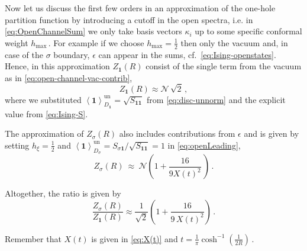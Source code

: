 \documentclass[11pt,a4paper]{article}
\numberwithin{equation}{section}
\newcommand{\one}{\mathbf{1}} %
\begin{document}
Now let us discuss the first few orders in an approximation of the one-hole partition function by introducing a cutoff in the open spectra, i.e. in \eqref{eq:OpenChannelSum} we only take basis vectors $\kappa_i$ 
up to some specific conformal weight $h_\mathrm{max}$\,. 
For example if we choose $h_\mathrm{max} = \frac12$ then only the vacuum and, in case of the $\sigma$ boundary, $\epsilon$ can appear in the sums, cf.\ \eqref{eq:Ising-openstates}. Hence, in this approximation $Z_\one(R)$ consist of the single term from the vacuum as in \eqref{eq:open-channel-vac-contrib},
\begin{equation}
    Z_\one(R) 
    \approx \mathcal{N} \, \sqrt{2} 
     \,,
\end{equation}
where we substituted $\left\langle\one\right\rangle_{D_\one}^\mathrm{un} = \sqrt{S_{\one\one}}$ from \eqref{eq:disc-unnorm} and the explicit value from \eqref{eq:Ising-S}.

The approximation of $Z_\sigma(R)$ also includes contributions from $\epsilon$ and is given by setting $h_\xi = \frac12$ 
and $\left\langle\one\right\rangle_{D_\sigma}^\mathrm{un} = S_{\sigma\one} /\sqrt{S_{\one\one}} = 1$
in \eqref{eq:openLeading},
\begin{equation}
    Z_\sigma(R) ~\approx~ \mathcal{N} \left(1 +  \frac{16}{9 X(t)^2} \, \right)\,.
\end{equation}

\noindent
Altogether, the ratio is given by
%
\begin{equation}
    \frac{Z_\sigma(R)}{Z_\one(R)} \approx \frac{1}{\sqrt{2}} \left(1 + \frac{16}{9\,X(t)^2}  \right)\,.
\end{equation}

\noindent 
Remember that $X(t)$ is given in \eqref{eq:X(t)} and $t = \frac1\pi \cosh^{-1}\!\left(\frac{1}{2R}\right)$\,.
\end{document}
